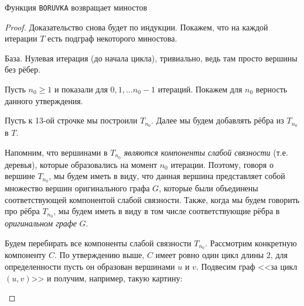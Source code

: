 \St Функция \texttt{BORUVKA} возвращает миностов
\begin{proof}
    
    Доказательство снова будет по индукции. Покажем, что на каждой итерации $T$ есть подграф некоторого миностова.

    База. Нулевая итерация (до начала цикла), тривиально, ведь там просто вершины без рёбер.

    Пусть $n_0 \geq 1$ и показали для $0, 1, \dots n_0 - 1$ итераций. Покажем для $n_0$ верность данного утверждения.

    Пусть к 13-ой строчке мы построили $T_{n_0}$. Далее мы будем добавлять рёбра из $T_{n_0}$ в $T$.

    Напомним, что вершинами в $T_{n_0}$ \textit{являются компоненты слабой связности} (т.е. деревья), которые образовались на момент $n_0$ итерации. 
    Поэтому, говоря о вершине $T_{n_0}$, мы будем иметь в виду, что данная вершина представляет собой множество вершин оригинального графа $G$, которые были объединены соответствующей компонентой слабой связности. 
    Также, когда мы будем говорить про рёбра $T_{n_0}$, мы будем иметь в виду в том числе соответствующие рёбра в \textit{оригинальном графе} $G$.

    Будем перебирать все компоненты слабой связности $T_{n_0}$. Рассмотрим конкретную компоненту $C$. По утверждению выше, $C$ имеет ровно один цикл длины 2, для определенности пусть он образован вершинами $u$ и $v$.
    Подвесим граф <<за цикл $(u, v)$>> и получим, например, такую картину:

    \begin{figure}[H]
        \centering
\end{figure}
\end{proof}
